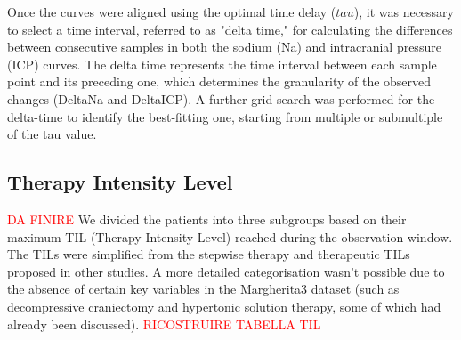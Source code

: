 Once the curves were aligned using the optimal time delay ($tau$), it was necessary to select a time interval, referred to as "delta time," for calculating the differences between consecutive samples in both the sodium (Na) and intracranial pressure (ICP) curves. The delta time represents the time interval between each sample point and its preceding one, which determines the granularity of the observed changes (DeltaNa and DeltaICP). 
A further grid search was performed for the delta-time to identify the best-fitting one, starting from multiple or submultiple of the tau value.

\subsection{Therapy Intensity Level}
\textcolor{red}{DA FINIRE}
We  divided the patients into three subgroups based on their maximum TIL (Therapy Intensity Level) reached during the observation window. The TILs were simplified from the stepwise therapy and therapeutic TILs proposed in other studies. A more detailed categorisation wasn’t possible due to the absence of certain key variables in the Margherita3 dataset (such as decompressive craniectomy and hypertonic solution therapy, some of which had already been discussed).
\textcolor{red}{RICOSTRUIRE TABELLA TIL}

